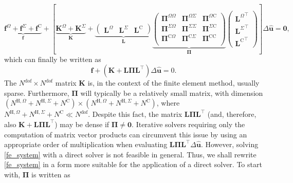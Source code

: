 \documentclass[pdftex,a4paper,12pt,abstracton]{scrartcl}
\begin{document}
\begin{equation}
\underbrace{\boldsymbol{f}^\Omega + \boldsymbol{f}^\Sigma + \boldsymbol{f}^\mathrm{C}}_{\mbox{$\boldsymbol{f}$}} +
\left[
 \underbrace{\boldsymbol{K}^\Omega+
 \boldsymbol{K}^\Sigma}_{\mbox{$\boldsymbol{K}$}}+
 \underbrace{\begin{pmatrix}
  \boldsymbol{L}^\Omega & \boldsymbol{L}^\Sigma & \boldsymbol{L}^\mathrm{C}
 \end{pmatrix}}_{\mbox{$\boldsymbol{L}$}}
 \underbrace{
 \begin{pmatrix}
  \boldsymbol{\Pi}^{\Omega\Omega} & \boldsymbol{\Pi}^{\Omega\Sigma} & \boldsymbol{\Pi}^{\Omega\mathrm{C}} \\
  \boldsymbol{\Pi}^{\Sigma\Omega} & \boldsymbol{\Pi}^{\Sigma\Sigma} & \boldsymbol{\Pi}^{\Sigma\mathrm{C}} \\
  \boldsymbol{\Pi}^{\mathrm{C}\Omega} & \boldsymbol{\Pi}^{\mathrm{C}\Sigma} & \boldsymbol{\Pi}^{\mathrm{C}\mathrm{C}} \\
 \end{pmatrix}}_{\mbox{$\boldsymbol{\Pi}$}}
 \begin{pmatrix}
  {\boldsymbol{L}^\Omega}^\top \\ {\boldsymbol{L}^\Sigma}^\top \\ {\boldsymbol{L}^\mathrm{C}}^\top
 \end{pmatrix}
\right]\Delta\boldsymbol{\hat u} = \boldsymbol{0},
\end{equation}
which can finally be written as
\begin{equation}
\boldsymbol{f} + \left( \boldsymbol{K} + \boldsymbol{L} \boldsymbol{\Pi} \boldsymbol{L}^\top \right) \Delta\boldsymbol{\hat u} = 0.
\label{fe_system}
\end{equation}
The $N^\mathrm{dof} \times N^\mathrm{dof}$ matrix $\boldsymbol{K}$ is, in the context of the finite element method, usually sparse. Furthermore, $\boldsymbol{\Pi}$ will typically be a relatively small matrix, with dimension $(N^{\mathrm{H},\Omega} + N^{\mathrm{H},\Sigma} + N^{\mathrm{C}}) \times (N^{\mathrm{H},\Omega} + N^{\mathrm{H},\Sigma} + N^{\mathrm{C}})$, where $N^{\mathrm{H},\Omega} + N^{\mathrm{H},\Sigma} + N^{\mathrm{C}} \ll N^\mathrm{dof}$. Despite this fact, the matrix $\boldsymbol{L} \boldsymbol{\Pi} \boldsymbol{L}^\top$ (and, therefore, also $\boldsymbol{K} + \boldsymbol{L} \boldsymbol{\Pi} \boldsymbol{L}^\top$) may be dense if $\boldsymbol{\Pi} \neq \boldsymbol{0}$. Iterative solvers requiring only the computation of matrix vector products can circumvent this issue by using an appropriate order of multiplication when evaluating $\boldsymbol{L} \boldsymbol{\Pi} \boldsymbol{L}^\top \Delta\boldsymbol{\hat u}$. However, solving \eqref{fe_system} with a direct solver is not feasible in general. Thus, we shall rewrite \eqref{fe_system} in a form more suitable for the application of a direct solver. To start with, $\boldsymbol{\Pi}$ is written as
\end{document}

